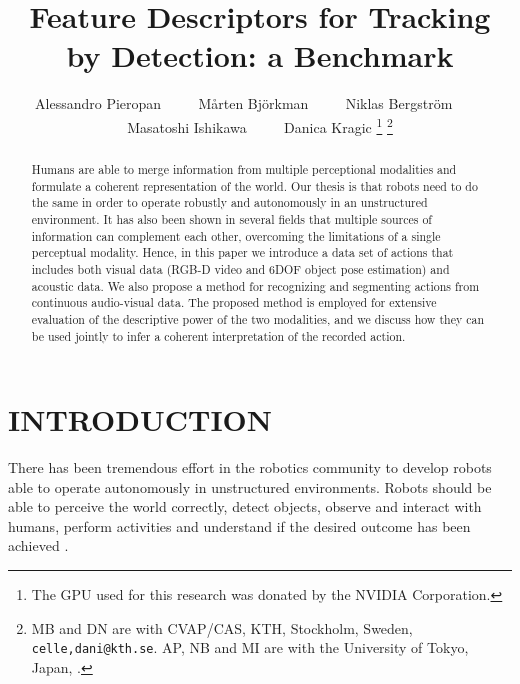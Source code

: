 \documentclass[letterpaper, 10pt, conference]{ieeeconf}
\title{\LARGE \bf Feature Descriptors for Tracking by Detection: a Benchmark}
\author{Alessandro Pieropan ~~~~ Mårten Bj{\"o}rkman  ~~~~ Niklas Bergstr{\"o}m ~~~~  Masatoshi Ishikawa ~~~~ Danica Kragic%
\thanks{The GPU used for this research was donated by the NVIDIA Corporation.}
\thanks{MB and DN are with CVAP/CAS, KTH, Stockholm, Sweden, {\tt celle,dani@kth.se}. AP, NB and MI are with the University of Tokyo, Japan, {\tt }.}}
\begin{document}
                                                                
                                                                                
\maketitle                                                                      
\thispagestyle{empty}                                                           
\pagestyle{empty}



\begin{abstract}

Humans are able to merge information from multiple perceptional modalities and formulate a 
coherent representation of the world. Our thesis is that robots need to do the same in order to operate robustly and autonomously in an unstructured environment. 
It has also been shown in several fields that multiple sources of information can complement each other,  overcoming the limitations of a single perceptual modality.
Hence, in this paper we introduce a data set of actions that includes both 
visual data (RGB-D video and 6DOF object pose estimation) and 
acoustic data. We also propose a method for recognizing and segmenting actions from 
continuous audio-visual data. The proposed method is employed for extensive evaluation
of the descriptive power of the two modalities, and we discuss how they 
can be used jointly to infer a coherent interpretation of the recorded action.

\end{abstract}

\section{INTRODUCTION}
\label{sec:introduction}


There has been tremendous effort in the robotics community to develop robots able to operate autonomously in unstructured environments. Robots should be able to perceive the world correctly, detect objects, observe and interact with humans, perform activities and understand if the desired outcome has been achieved \cite{montesano08}.
\end{document}
